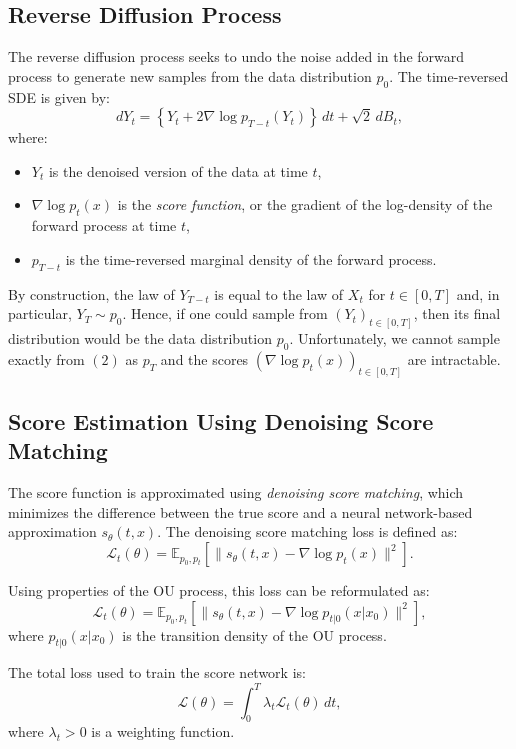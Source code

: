 \documentclass[a4paper,14pt]{article}
\theoremstyle{plain} %
\theoremstyle{definition} %
\theoremstyle{remark} %
\theoremstyle{definition}
\theoremstyle{remark}
\theoremstyle{remark}
\begin{document}
	\subsection{Reverse Diffusion Process}
	
	The reverse diffusion process seeks to undo the noise added in the forward process to generate new samples from the data distribution \( p_0 \). The time-reversed SDE is given by:
	\[
	dY_t = \left\{ Y_t + 2 \nabla \log p_{T-t}(Y_t) \right\} \, dt + \sqrt{2} \, dB_t,
	\]
	where:
	\begin{itemize}
		\item \( Y_t \) is the denoised version of the data at time \( t \),
		\item \( \nabla \log p_t(x) \) is the \textit{score function}, or the gradient of the log-density of the forward process at time \( t \),
		\item \( p_{T-t} \) is the time-reversed marginal density of the forward process.
	\end{itemize}
	
	By construction, the law of \( Y_{T-t} \) is equal to the law of \( X_t \) for \( t \in [0, T] \) and, in particular, \( Y_T \sim p_0 \). Hence, if one could sample from \( (Y_t)_{t \in [0, T]} \), then its final distribution would be the data distribution \( p_0 \). Unfortunately, we cannot sample exactly from \((2)\) as \( p_T \) and the scores \( (\nabla \log p_t(x))_{t \in [0, T]} \) are intractable. 
	
	\subsection{Score Estimation Using Denoising Score Matching}
	
	The score function is approximated using \textit{denoising score matching}, which minimizes the difference between the true score and a neural network-based approximation \( s_\theta(t, x) \). The denoising score matching loss is defined as:
	\[
	\mathcal{L}_t(\theta) = \mathbb{E}_{p_0, p_t} \left[ \| s_\theta(t, x) - \nabla \log p_t(x) \|^2 \right].
	\]
	
	Using properties of the OU process, this loss can be reformulated as:
	\[
	\mathcal{L}_t(\theta) = \mathbb{E}_{p_0, p_t} \left[ \| s_\theta(t, x) - \nabla \log p_{t|0}(x | x_0) \|^2 \right],
	\]
	where \( p_{t|0}(x | x_0) \) is the transition density of the OU process.
	
	The total loss used to train the score network is:
	\[
	\mathcal{L}(\theta) = \int_0^T \lambda_t \mathcal{L}_t(\theta) \, dt,
	\]
	where \( \lambda_t > 0 \) is a weighting function.
	
\end{document}
